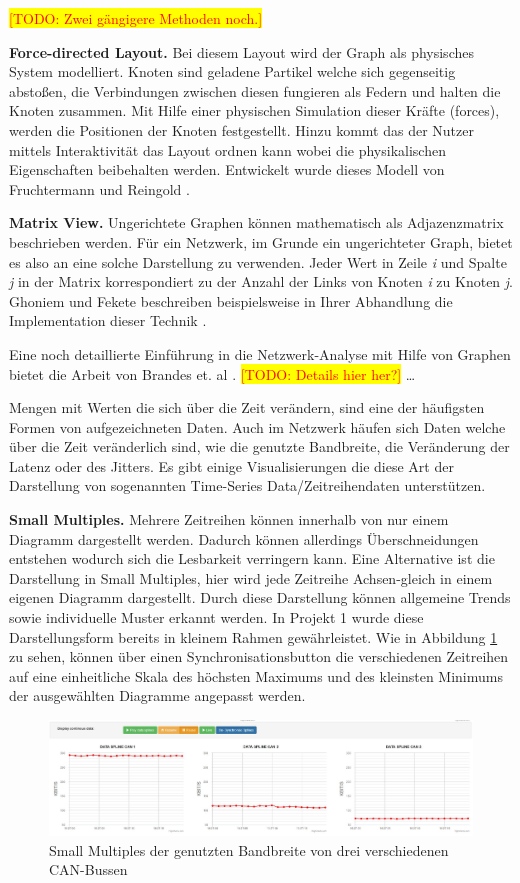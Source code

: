 \documentclass[draft=false
              ,paper=a4
              ,twoside=false
              ,fontsize=11pt
              ,headsepline
              ,BCOR10mm
              ,DIV11
              ]{scrbook}
\newcommand{\TODO}[1]{\colorbox{yellow}{\textcolor{red}{[TODO: #1]}}}
\begin{document}
\TODO{Zwei gängigere Methoden noch.}

\textbf{Force-directed Layout.}  Bei diesem Layout wird der Graph als physisches System modelliert. Knoten sind geladene Partikel welche sich gegenseitig abstoßen, die Verbindungen zwischen diesen fungieren als Federn und halten die Knoten zusammen. Mit Hilfe einer physischen Simulation dieser Kräfte (forces), werden die Positionen der Knoten festgestellt. Hinzu kommt das der Nutzer mittels Interaktivität das Layout ordnen kann wobei die physikalischen Eigenschaften beibehalten werden. Entwickelt wurde dieses Modell von Fruchtermann und Reingold \cite{Fruchterman91graphdrawing}. 

\textbf{Matrix View.} Ungerichtete Graphen können mathematisch als Adjazenzmatrix beschrieben werden. Für ein Netzwerk, im Grunde ein ungerichteter Graph, bietet es also an eine solche Darstellung zu verwenden. Jeder Wert in Zeile \textit{i} und Spalte \textit{j} in der Matrix korrespondiert zu der Anzahl der Links von Knoten \textit{i} zu Knoten \textit{j}. Ghoniem und Fekete beschreiben beispielsweise in Ihrer Abhandlung die Implementation dieser Technik \cite{Ghoniem:2003:MVG:1063669.1063698}.

Eine noch detaillierte Einführung in die Netzwerk-Analyse mit Hilfe von Graphen bietet die Arbeit von Brandes et. al \cite{brandes2005network}. \TODO{Details hier her?}
\ldots


Mengen mit Werten die sich über die Zeit verändern, sind eine der häufigsten Formen von aufgezeichneten Daten. Auch im Netzwerk häufen sich Daten welche über die Zeit veränderlich sind, wie die genutzte Bandbreite, die Veränderung der Latenz oder des Jitters. Es gibt einige Visualisierungen die diese Art der Darstellung von sogenannten Time-Series Data/Zeitreihendaten unterstützen. 

\textbf{Small Multiples.} Mehrere Zeitreihen können innerhalb von nur einem Diagramm dargestellt werden. Dadurch können allerdings Überschneidungen entstehen wodurch sich die Lesbarkeit verringern kann. Eine Alternative ist die Darstellung in Small Multiples, hier wird jede Zeitreihe Achsen-gleich in einem eigenen Diagramm dargestellt. Durch diese Darstellung können allgemeine Trends sowie individuelle Muster erkannt werden. In Projekt 1 wurde diese Darstellungsform bereits in kleinem Rahmen gewährleistet. Wie in Abbildung \ref{fig:synch_splines} zu sehen, können über einen Synchronisationsbutton die verschiedenen Zeitreihen auf eine einheitliche Skala des höchsten Maximums und des kleinsten Minimums der ausgewählten Diagramme angepasst werden.
\begin{figure}[htbp]
  \centering
  \includegraphics[width=\textwidth]{img/synch_splines}
  \caption{Small Multiples der genutzten Bandbreite von drei verschiedenen CAN-Bussen}
  \label{fig:synch_splines}
\end{figure}
\end{document}
